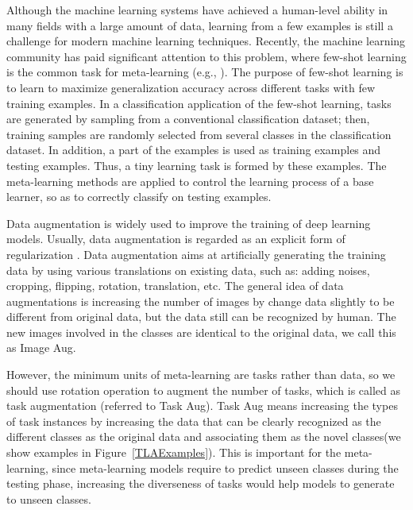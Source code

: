 \documentclass[10pt,twocolumn,letterpaper]{article}
\begin{document}
Although the machine learning systems have achieved a human-level ability in many fields with a large amount of data, learning from a few examples is still a challenge for modern machine learning techniques. Recently, the machine learning community has paid significant attention to this problem, where few-shot learning is the common task for meta-learning (e.g., \cite{ravi2017optimization,finn2017model,vinyals2016matching,snell2017prototypical}). The purpose of few-shot learning is to learn to maximize generalization accuracy across different tasks with few training examples. In a classification application of the few-shot learning, tasks are generated by sampling from a conventional classification dataset; then, training samples are randomly selected from several classes in the classification dataset. In addition, a part of the examples is used as training examples and testing examples. Thus, a tiny learning task is formed by these examples. The meta-learning methods are applied to control the learning process of a base learner, so as to correctly classify on testing examples. 

Data augmentation is widely used to improve the training of deep learning models. Usually, data augmentation is regarded as an explicit form of regularization \cite{he2016deep,simonyan2014very,krizhevsky2012imagenet}. Data augmentation aims at artificially generating the training data by using various translations on existing data, such as: adding noises, cropping, flipping, rotation, translation, etc. The general idea of data augmentations is increasing the number of images by change data slightly to be different from original data, but the data still can be recognized by human. The new images involved in the classes are identical to the original data, we call this as Image Aug.

However, the minimum units of meta-learning are tasks rather than data, so we should use rotation operation to augment the number of tasks, which is called as task augmentation (referred to Task Aug). Task Aug means increasing the types of task instances by increasing the data that can be clearly recognized as the different classes as the original data and associating them as the novel classes(we show examples in Figure~\ref{TLAExamples}). This is important for the meta-learning, since meta-learning models require to predict unseen classes during the testing phase, increasing the diverseness of tasks would help models to generate to unseen classes.
\end{document}
